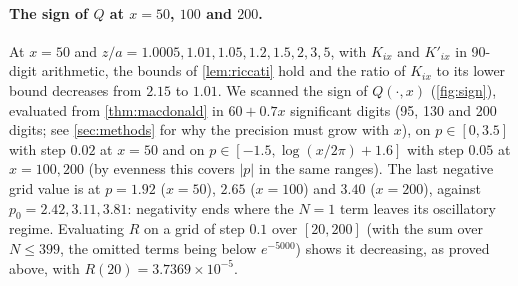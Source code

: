 \documentclass[11pt]{article}
\theoremstyle{definition}\newtheorem{definition}[theorem]{Definition}
\theoremstyle{remark}\newtheorem{remark}[theorem]{Remark}
\begin{document}
\paragraph{The sign of $Q$ at $x=50$, $100$ and $200$.} At $x=50$ and $z/a=1.0005,1.01,1.05,1.2,1.5,2,3,5$, with $K_{ix}$ and $K'_{ix}$ in 90-digit arithmetic, the bounds of \cref{lem:riccati} hold and the ratio of $K_{ix}$ to its lower bound decreases from $2.15$ to $1.01$. We scanned the sign of $Q(\cdot,x)$ (\cref{fig:sign}), evaluated from \cref{thm:macdonald} in $60+0.7x$ significant digits (95, 130 and 200 digits; see \cref{sec:methods} for why the precision must grow with $x$), on $p\in[0,3.5]$ with step $0.02$ at $x=50$ and on $p\in[-1.5,\log(x/2\pi)+1.6]$ with step $0.05$ at $x=100,200$ (by evenness this covers $|p|$ in the same ranges). The last negative grid value is at $p=1.92$ ($x=50$), $2.65$ ($x=100$) and $3.40$ ($x=200$), against $p_0=2.42,3.11,3.81$: negativity ends where the $N=1$ term leaves its oscillatory regime. Evaluating $R$ on a grid of step $0.1$ over $[20,200]$ (with the sum over $N\le399$, the omitted terms being below $e^{-5000}$) shows it decreasing, as proved above, with $R(20)=3.7369\times10^{-5}$.
\end{document}
